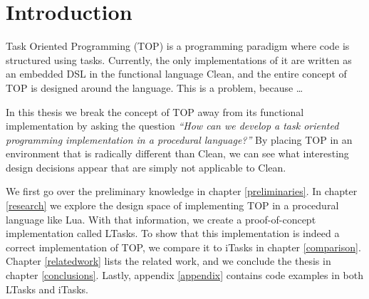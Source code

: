 \chapter{Introduction}\label{introduction}

Task Oriented Programming (TOP) is a programming paradigm where code is structured using tasks. Currently, the only implementations of it are written as an embedded DSL in the functional language Clean, and the entire concept of TOP is designed around the language. This is a problem, because \dots

In this thesis we break the concept of TOP away from its functional implementation by asking the question \textit{``How can we develop a task oriented programming implementation in a procedural language?''}
By placing TOP in an environment that is radically different than Clean, we can see what interesting design decisions appear that are simply not applicable to Clean.

We first go over the preliminary knowledge in chapter \ref{preliminaries}. In chapter \ref{research} we explore the design space of implementing TOP in a procedural language like Lua. With that information, we create a proof-of-concept implementation called LTasks. To show that this implementation is indeed a correct implementation of TOP, we compare it to iTasks in chapter \ref{comparison}. Chapter \ref{relatedwork} lists the related work, and we conclude the thesis in chapter \ref{conclusions}. Lastly, appendix \ref{appendix} contains code examples in both LTasks and iTasks.

